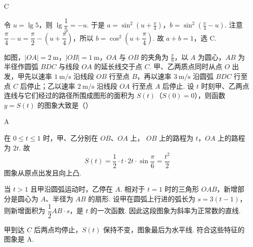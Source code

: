 \begin{answer}
C
\end{answer}

\begin{solution}
令 \(u=\lg5\)，则 \(\lg\dfrac15=-u\). 于是
\(a=\sin^2\left(u+\frac{\pi}{4}\right)\)，\(b=\sin^2\left(\frac{\pi}{4}-u\right)\).
注意 \(\dfrac{\pi}{4}-u=\dfrac{\pi}{2}-\left(u+\dfrac{\pi}{4}\right)\)，所以
\(b=\cos^2\left(u+\dfrac{\pi}{4}\right)\). 故
\(a+b=1\)，选 C.
\end{solution}

\begin{problem}
如图，\(|OA| = 2 \mathrm{~m}\)，\(|OB| = 1 \mathrm{~m}\)，\(OA\) 与 \(OB\) 的夹角为 \(\frac{\pi}{6}\)，以 \(A\) 为圆心，\(AB\) 为半径作圆弧 \(BDC\) 与线段 \(OA\) 的延长线交于点 \(C\). 甲、乙两质点同时从点 \(O\) 出发，甲先以速率 \(1 \mathrm{~m/s}\) 沿线段 \(OB\) 行至点 \(B\)，再以速率 \(3 \mathrm{~m/s}\) 沿圆弧 \(BDC\) 行至点 \(C\) 后停止；乙以速率 \(2 \mathrm{~m/s}\) 沿线段 \(OA\) 行至点 \(A\) 后停止. 设 \(t\) 时刻甲、乙两点连线与它们经过的路径所围成图形的面积为 \(S(t)\)（\(S(0)=0\)），则函数 \(y = S(t)\) 的图象大致是（\quad）


    {}
    {}
    {}
\end{problem}

\begin{answer}
A
\end{answer}

\begin{solution}
在 \(0\leqslant t\leqslant1\) 时，甲、乙分别在 \(OB\)、\(OA\) 上，
\(OB\) 上的路程为 \(t\)，\(OA\) 上的路程为 \(2t\). 故
\[
S(t)=\frac12\cdot t\cdot2t\cdot\sin\frac{\pi}{6}=\frac{t^2}{2}
\]
图象从原点出发且向上凸.

当 \(t>1\) 且甲沿圆弧运动时，乙停在 \(A\). 相对于 \(t=1\) 时的三角形 \(OAB\)，新增部分是圆心为 \(A\)、半径为 \(AB\) 的扇形. 设甲在圆弧上行进的弧长为 \(s=3(t-1)\)，则新增面积为
\(\dfrac12 AB\cdot s\)，是 \(t\) 的一次函数. 因此这段图象为斜率为正常数的直线.

甲到达 \(C\) 后两点均停止，\(S(t)\) 保持不变，图象最后为水平线. 符合这些特征的图象是 A.
\end{solution}

